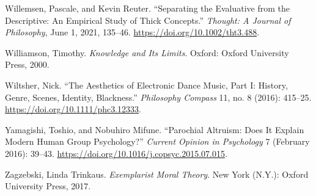 \documentclass[
  12pt,
]{book}
\newlength{\cslhangindent}
\newenvironment{CSLReferences}[2] %
 {\begin{list}{}{%
  \setlength{\itemindent}{0pt}
  \setlength{\leftmargin}{0pt}
  \setlength{\parsep}{0pt}
  \ifodd #1
   \setlength{\leftmargin}{\cslhangindent}
   \setlength{\itemindent}{-1\cslhangindent}
  \fi
  \setlength{\itemsep}{#2\baselineskip}}}
 {\end{list}}
\theoremstyle{definition}
\theoremstyle{definition}
\theoremstyle{definition}
\theoremstyle{definition}
\theoremstyle{remark}
\begin{document}
\begin{CSLReferences}{1}{0}
Willemsen, Pascale, and Kevin Reuter. {``Separating the Evaluative from the Descriptive: {An} Empirical Study of Thick Concepts.''} \emph{Thought: A Journal of Philosophy}, June 1, 2021, 135--46. \url{https://doi.org/10.1002/tht3.488}.

Williamson, Timothy. \emph{Knowledge and {Its Limits}}. Oxford: Oxford University Press, 2000.

Wiltsher, Nick. {``The {Aesthetics} of {Electronic Dance Music}, {Part I}: {History}, {Genre}, {Scenes}, {Identity}, {Blackness}.''} \emph{Philosophy Compass} 11, no. 8 (2016): 415--25. \url{https://doi.org/10.1111/phc3.12333}.

Yamagishi, Toshio, and Nobuhiro Mifune. {``Parochial {Altruism}: {Does It Explain Modern Human Group Psychology}?''} \emph{Current Opinion in Psychology} 7 (February 2016): 39--43. \url{https://doi.org/10.1016/j.copsyc.2015.07.015}.

Zagzebski, Linda Trinkaus. \emph{Exemplarist {Moral Theory}}. New York (N.Y.): Oxford University Press, 2017.

\end{CSLReferences}
\end{document}
